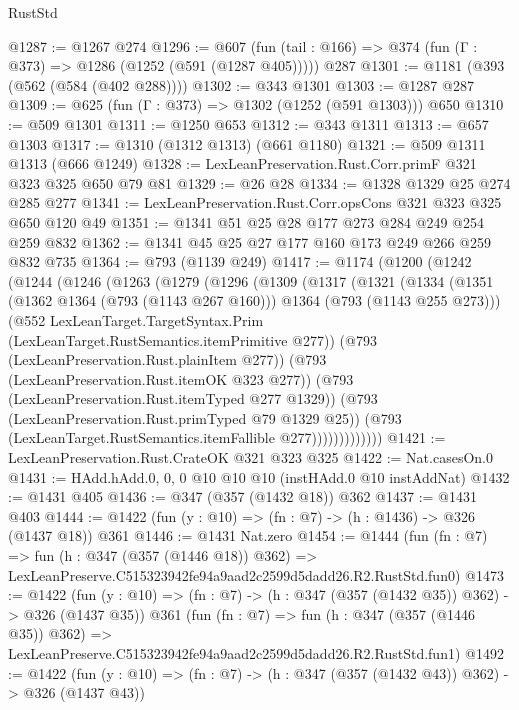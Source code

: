 \begin{lexlean}{RustStd}
\begin{coremodule}
@1287 := @1267 @274
@1296 := @607 (fun (tail : @166) => @374 (fun (Γ : @373) => @1286 (@1252 (@591 (@1287 @405))))) @287
@1301 := @1181 (@393 (@562 (@584 (@402 @288))))
@1302 := @343 @1301
@1303 := @1287 @287
@1309 := @625 (fun (Γ : @373) => @1302 (@1252 (@591 @1303))) @650
@1310 := @509 @1301
@1311 := @1250 @653
@1312 := @343 @1311
@1313 := @657 @1303
@1317 := @1310 (@1312 @1313) (@661 @1180)
@1321 := @509 @1311 @1313 (@666 @1249)
@1328 := LexLeanPreservation.Rust.Corr.primF @321 @323 @325 @650 @79 @81
@1329 := @26 @28
@1334 := @1328 @1329 @25 @274 @285 @277
@1341 := LexLeanPreservation.Rust.Corr.opsCons @321 @323 @325 @650 @120 @49
@1351 := @1341 @51 @25 @28 @177 @273 @284 @249 @254 @259 @832
@1362 := @1341 @45 @25 @27 @177 @160 @173 @249 @266 @259 @832 @735
@1364 := @793 (@1139 @249)
@1417 := @1174
    (@1200
      (@1242
        (@1244
          (@1246
            (@1263
              (@1279
                (@1296
                  (@1309
                    (@1317
                      (@1321
                        (@1334
                          (@1351
                            (@1362 @1364 (@793 (@1143 @267 @160)))
                            @1364
                            (@793 (@1143 @255 @273)))
                          (@552
                            LexLeanTarget.TargetSyntax.Prim
                            (LexLeanTarget.RustSemantics.itemPrimitive @277))
                          (@793 (LexLeanPreservation.Rust.plainItem @277))
                          (@793 (LexLeanPreservation.Rust.itemOK @323 @277))
                          (@793 (LexLeanPreservation.Rust.itemTyped @277 @1329))
                          (@793 (LexLeanPreservation.Rust.primTyped @79 @1329 @25))
                          (@793 (LexLeanTarget.RustSemantics.itemFallible @277)))))))))))))
@1421 := LexLeanPreservation.Rust.CrateOK @321 @323 @325
@1422 := Nat.casesOn.{0}
@1431 := HAdd.hAdd.{0, 0, 0} @10 @10 @10 (instHAdd.{0} @10 instAddNat)
@1432 := @1431 @405
@1436 := @347 (@357 (@1432 @18)) @362
@1437 := @1431 @403
@1444 := @1422 (fun (y : @10) => (fn : @7) -> (h : @1436) -> @326 (@1437 @18)) @361
@1446 := @1431 Nat.zero
@1454 := @1444
    (fun (fn : @7) =>
    fun (h : @347 (@357 (@1446 @18)) @362) =>
    LexLeanPreserve.C515323942fe94a9aad2c2599d5dadd26.R2.RustStd.fun0)
@1473 := @1422
    (fun (y : @10) => (fn : @7) -> (h : @347 (@357 (@1432 @35)) @362) -> @326 (@1437 @35))
    @361
    (fun (fn : @7) =>
    fun (h : @347 (@357 (@1446 @35)) @362) =>
    LexLeanPreserve.C515323942fe94a9aad2c2599d5dadd26.R2.RustStd.fun1)
@1492 := @1422
    (fun (y : @10) => (fn : @7) -> (h : @347 (@357 (@1432 @43)) @362) -> @326 (@1437 @43))

\end{coremodule}
\end{lexlean}
